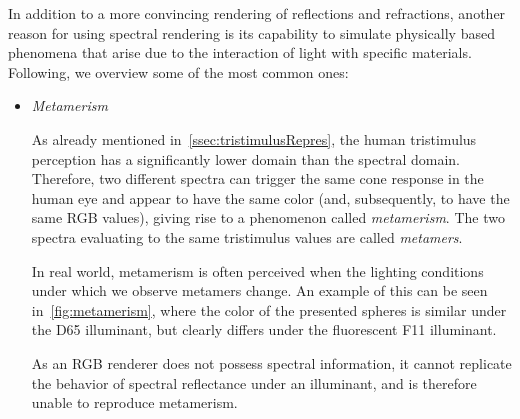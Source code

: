 In addition to a more convincing rendering of reflections and refractions, another reason for using spectral rendering is its capability to simulate physically based phenomena that arise due to the interaction of light with specific materials. Following, we overview some of the most common ones:
\begin{itemize}
\item \emph{Metamerism} \label{item:metamerism}

As already mentioned in~\cref{ssec:tristimulusRepres}, the human tristimulus perception has a significantly lower domain than the spectral domain. Therefore, two different spectra can trigger the same cone response in the human eye and appear to have the same color (and, subsequently, to have the same RGB values), giving rise to a phenomenon called \emph{metamerism}. The two spectra evaluating to the same tristimulus values are called \emph{metamers}.

In real world, metamerism is often perceived when the lighting conditions under which we observe metamers change. An example of this can be seen in~\cref{fig:metamerism}, where the color of the presented spheres is similar under the D65 illuminant, but clearly differs under the fluorescent F11 illuminant.

As an RGB renderer does not possess spectral information, it cannot replicate the behavior of spectral reflectance under an illuminant, and is therefore unable to reproduce metamerism.


\end{itemize}
